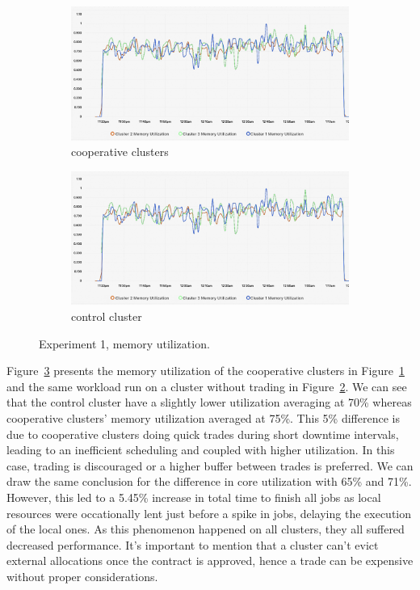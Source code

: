 \begin{figure}[H]
\centering
\begin{subfigure}{.5\textwidth}
  \centering
  \includegraphics[width=.9\linewidth]{./figures/experiment-one/exp-one.png}
  \caption{cooperative clusters}
  \label{fig:exp1coop}
\end{subfigure}%
\begin{subfigure}{.5\textwidth}
  \centering
  \includegraphics[width=.9\linewidth]{./figures/experiment-one/exp-one-control.png}
  \caption{control cluster}
  \label{fig:exp1control}
\end{subfigure}
\caption{Experiment 1, memory utilization.}
\label{fig:exp1memutil}
\end{figure}

Figure~\ref{fig:exp1memutil} presents the memory utilization of the cooperative
clusters in Figure~\ref{fig:exp1coop} and the same workload run on a cluster without
trading in Figure~\ref{fig:exp1control}.
We can see that the control cluster have a slightly lower utilization averaging
at 70\% whereas cooperative clusters' memory utilization averaged at 75\%. This
5\% difference is due to cooperative clusters doing quick trades during short
downtime intervals, leading to an inefficient scheduling and coupled with
higher utilization. In this case, trading is discouraged or a higher buffer
between trades is preferred. We can draw the same conclusion for the difference
in core utilization with 65\% and 71\%. However, this led to a 5.45\% increase
in total time to finish all jobs as local resources were occationally lent
just before a spike in jobs, delaying the execution of the local ones. As this
phenomenon happened on all clusters, they all suffered decreased performance.
It's important to mention that a cluster can't evict external allocations once
the contract is approved, hence a trade can be expensive without proper
considerations.

